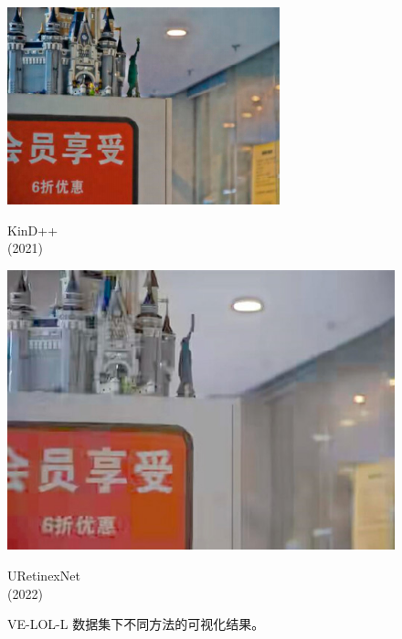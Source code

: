\documentclass[CJK,aspectratio=169]{beamer}  %
\begin{document}
\begin{frame}
\begin{figure}
\begin{minipage}{.6\columnwidth}
\begin{minipage}{0.18\columnwidth}
				\includegraphics[width=\linewidth]{picture/LLIE/VE-LOL-L/KinD++}
				\captionsetup{justification=centering}
				\caption*{\tiny KinD++ \\ (2021)}
				\label{fig: KinD++}	
			\end{minipage}
			\begin{minipage}{0.18\columnwidth}
				\includegraphics[width=\linewidth]{picture/LLIE/VE-LOL-L/URetinexNet}
				\captionsetup{justification=centering}
				\caption*{\tiny URetinexNet \\ (2022)}
				\label{fig: URetinexNet}	
			\end{minipage}
			\caption{
				\label{fig: VE-LOL-L Visual} 
				\tiny VE-LOL-L 数据集下不同方法的可视化结果。
			}
		\end{minipage}
		\end{figure}
	\end{frame}
	
\end{document}

